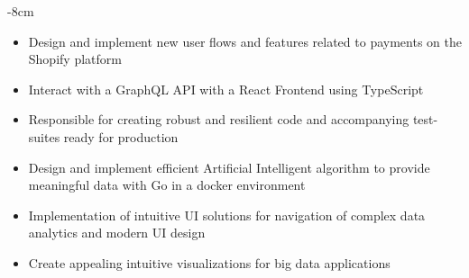 \documentclass[10pt,a4paper]{altacv}
\begin{document}

\begin{adjustwidth}{}{-8cm}
\makecvheader
\end{adjustwidth}


\begin{itemize}
\item Design and implement new user flows and features related to payments on the Shopify platform
\item Interact with a GraphQL API with a React Frontend using TypeScript
\item Responsible for creating robust and resilient code and accompanying test-suites ready for production
\end{itemize}

\divider

\begin{itemize}
\item Design and implement efficient Artificial Intelligent algorithm to provide meaningful data with Go in a docker environment
\item Implementation of intuitive UI solutions for navigation of complex data analytics and modern UI design
\item Create appealing intuitive visualizations for big data applications
\end{itemize}
\end{document}
